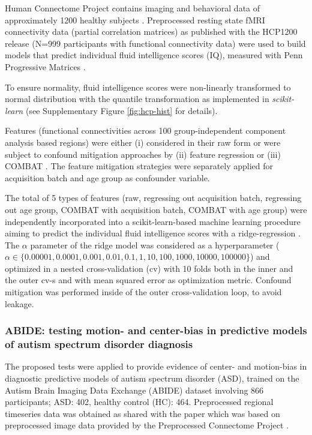 \documentclass{article}
\begin{document}
Human Connectome Project contains imaging and behavioral data of approximately 1200 healthy subjects \citep{van2013wu}. Preprocessed resting state fMRI connectivity data (partial correlation matrices) \citep{glasser2013minimal} as published with the HCP1200 release (N=999 participants with functional connectivity data) were used to build models that predict individual fluid intelligence scores (IQ), measured with Penn Progressive Matrices \citep{duncan2000neural}.

To ensure normality, fluid intelligence scores were non-linearly transformed to normal distribution with the quantile transformation \citep{beasley2009rank} as implemented in \emph{scikit-learn} \citep{pedregosa2011scikit} (see Supplementary Figure \ref{fig:hcp-hist} for details).

Features (functional connectivities across 100 group-independent component analysis based regions) were either (i) considered in their raw form or were subject to confound mitigation approaches by (ii) feature regression \citep{rao2017predictive} or (iii) COMBAT \citep{johnson2007adjusting, fortin2018harmonization}.
The feature mitigation strategies were separately applied for acquisition batch and age group as confounder variable.

The total of 5 types of features (raw, regressing out acquisition batch, regressing out age group, COMBAT with acquisition batch, COMBAT with age group) were independently incorporated into a scikit-learn-based \citep{pedregosa2011scikit} machine learning procedure aiming to predict the individual fluid intelligence scores with a ridge-regression \citep{hoerl1970ridge}. The $\alpha$ parameter of the ridge model was considered as a hyperparameter ($\alpha \in \{0.00001, 0.0001, 0.001, 0.01, 0.1, 1, 10, 100, 1000, 10000, 100000\}$) and optimized in a nested cross-validation (cv) with 10 folds both in the inner and the outer cv-s and with mean squared error as optimization metric. Confound mitigation was performed inside of the outer cross-validation loop, to avoid leakage.


\subsubsection*{ABIDE: testing motion- and center-bias in predictive models of autism spectrum disorder diagnosis}

The proposed tests were applied to provide evidence of center- and  motion-bias in diagnostic predictive models of autism spectrum disorder (ASD), trained on the Autism Brain Imaging Data Exchange (ABIDE) dataset \citep{di2014autism} involving 866 participants; ASD: 402, healthy control (HC): 464. Preprocessed regional timeseries data was obtained as shared with the paper \citep{dadi2019benchmarking} which was based on preprocessed image data provided by the Preprocessed Connectome Project \citep{craddock2013neuro}.
\end{document}
